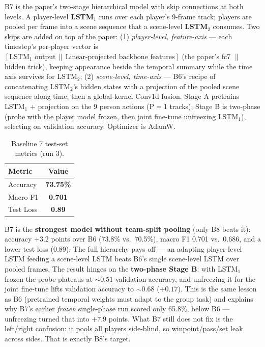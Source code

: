\documentclass[9pt,a4paper,twocolumn,twoside]{tau-class/tau}
\begin{document}
B7 is the paper's two-stage hierarchical model with skip connections at both levels. A player-level \textbf{LSTM$_1$} runs over each player's 9-frame track; players are pooled per frame into a scene sequence that a scene-level \textbf{LSTM$_2$} consumes. Two skips are added on top of the paper: (1) \emph{player-level, feature-axis} --- each timestep's per-player vector is $[\text{LSTM}_1\text{ output} \,\|\, \text{Linear-projected backbone features}]$ (the paper's fc7 $\|$ hidden trick), keeping appearance beside the temporal summary while the time axis survives for LSTM$_2$; (2) \emph{scene-level, time-axis} --- B6's recipe of concatenating LSTM$_2$'s hidden states with a projection of the pooled scene sequence along time, then a global-kernel Conv1d fusion. Stage A pretrains LSTM$_1$ + projection on the 9 person actions (P$=$1 tracks); Stage B is two-phase (probe with the player model frozen, then joint fine-tune unfreezing LSTM$_1$), selecting on validation accuracy. Optimizer is AdamW.

\begin{table}[h]
    \centering
    \caption{Baseline 7 test-set metrics (run 3).}
    \label{tab:b7-metrics}
    \begin{tabular}{lc}
        \toprule
        \textbf{Metric} & \textbf{Value} \\
        \midrule
        Accuracy   & \textbf{73.75\%} \\
        Macro F1   & \textbf{0.701} \\
        Test Loss  & \textbf{0.89} \\
        \bottomrule
    \end{tabular}
\end{table}

B7 is the \textbf{strongest model without team-split pooling} (only B8 beats it): accuracy $+3.2$ points over B6 (73.8\% vs.\ 70.5\%), macro F1 0.701 vs.\ 0.686, and a lower test loss (0.89). The full hierarchy pays off --- an adapting player-level LSTM feeding a scene-level LSTM beats B6's single scene-level LSTM over pooled frames. The result hinges on the \textbf{two-phase Stage B}: with LSTM$_1$ frozen the probe plateaus at ${\sim}0.51$ validation accuracy, and unfreezing it for the joint fine-tune lifts validation accuracy to ${\sim}0.68$ ($+0.17$). This is the same lesson as B6 (pretrained temporal weights must adapt to the group task) and explains why B7's earlier \emph{frozen} single-phase run scored only 65.8\%, below B6 --- unfreezing turned that into $+7.9$ points. What B7 still does not fix is the left/right confusion: it pools all players side-blind, so winpoint/pass/set leak across sides. That is exactly B8's target.
\end{document}
